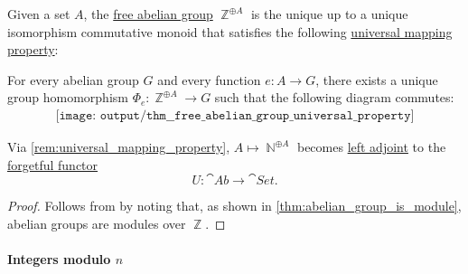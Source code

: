 \begin{theorem}\label{thm:free_abelian_group_universal_property}
  Given a set \( A \), the \hyperref[def:free_abelian_group]{free abelian group} \( \BbbZ^{\oplus A} \) is the unique up to a unique isomorphism commutative monoid that satisfies the following \hyperref[rem:universal_mapping_property]{universal mapping property}:
  \begin{displayquote}
    For every abelian group \( G \) and every function \( e: A \to G \), there exists a unique group homomorphism \( \Phi_e: \BbbZ^{\oplus A} \to G \) such that the following diagram commutes:
    \begin{equation}\label{eq:thm:free_abelian_group_universal_property/diagram}
      \begin{aligned}
        \texttt{[image: output/thm\_\_free\_abelian\_group\_universal\_property]}
      \end{aligned}
    \end{equation}
  \end{displayquote}
\end{theorem}
\begin{comments}
  \item Via \cref{rem:universal_mapping_property}, \( A \mapsto \BbbN^{\oplus A} \) becomes \hyperref[def:category_adjunction]{left adjoint} to the \hyperref[def:concrete_category]{forgetful functor}
  \begin{equation*}
    U: \cat{Ab} \to \cat{Set}.
  \end{equation*}
\end{comments}
\begin{proof}
  Follows from  by noting that, as shown in \cref{thm:abelian_group_is_module}, abelian groups are modules over \( \BbbZ \).
\end{proof}

\paragraph{Integers modulo \( n \)}

